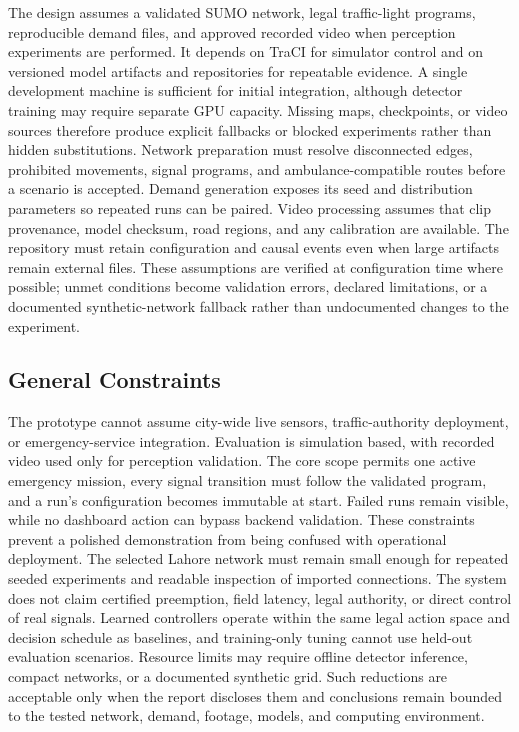 The design assumes a validated SUMO network, legal traffic-light programs, reproducible demand files, and approved recorded video when perception experiments are performed. It depends on TraCI for simulator control and on versioned model artifacts and repositories for repeatable evidence. A single development machine is sufficient for initial integration, although detector training may require separate GPU capacity. Missing maps, checkpoints, or video sources therefore produce explicit fallbacks or blocked experiments rather than hidden substitutions. Network preparation must resolve disconnected edges, prohibited movements, signal programs, and ambulance-compatible routes before a scenario is accepted. Demand generation exposes its seed and distribution parameters so repeated runs can be paired. Video processing assumes that clip provenance, model checksum, road regions, and any calibration are available. The repository must retain configuration and causal events even when large artifacts remain external files. These assumptions are verified at configuration time where possible; unmet conditions become validation errors, declared limitations, or a documented synthetic-network fallback rather than undocumented changes to the experiment.

\subsection{General Constraints}

The prototype cannot assume city-wide live sensors, traffic-authority deployment, or emergency-service integration. Evaluation is simulation based, with recorded video used only for perception validation. The core scope permits one active emergency mission, every signal transition must follow the validated program, and a run's configuration becomes immutable at start. Failed runs remain visible, while no dashboard action can bypass backend validation. These constraints prevent a polished demonstration from being confused with operational deployment. The selected Lahore network must remain small enough for repeated seeded experiments and readable inspection of imported connections. The system does not claim certified preemption, field latency, legal authority, or direct control of real signals. Learned controllers operate within the same legal action space and decision schedule as baselines, and training-only tuning cannot use held-out evaluation scenarios. Resource limits may require offline detector inference, compact networks, or a documented synthetic grid. Such reductions are acceptable only when the report discloses them and conclusions remain bounded to the tested network, demand, footage, models, and computing environment.

